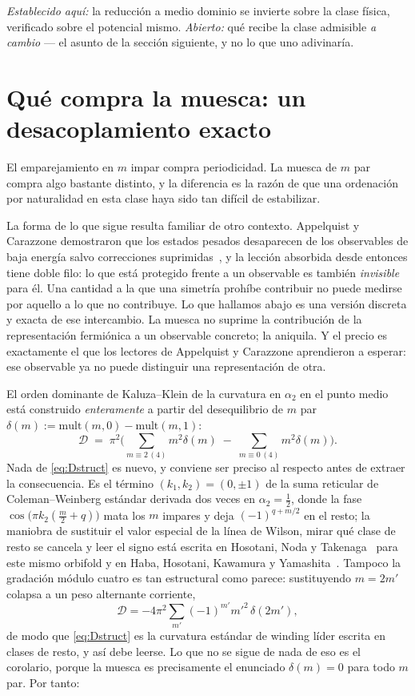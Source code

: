 \documentclass[11pt,a4paper]{article}
\begin{document}
\emph{Establecido aquí:} la reducción a medio dominio se invierte sobre la clase física,
verificado sobre el potencial mismo. \emph{Abierto:} qué recibe la clase admisible \emph{a
cambio} --- el asunto de la sección siguiente, y no lo que uno adivinaría.

\section{Qué compra la muesca: un desacoplamiento exacto}\label{sec:decoupling}
El emparejamiento en $m$ impar compra periodicidad. La muesca de $m$ par compra algo bastante
distinto, y la diferencia es la razón de que una ordenación por naturalidad en esta clase haya
sido tan difícil de estabilizar.

La forma de lo que sigue resulta familiar de otro contexto. Appelquist y Carazzone demostraron
que los estados pesados desaparecen de los observables de baja energía salvo correcciones
suprimidas~\cite{AppelquistCarazzone}, y la lección absorbida desde entonces tiene doble filo:
lo que está protegido frente a un observable es también \emph{invisible} para él. Una cantidad
a la que una simetría prohíbe contribuir no puede medirse por aquello a lo que no contribuye.
Lo que hallamos abajo es una versión discreta y exacta de ese intercambio. La muesca no
suprime la contribución de la representación fermiónica a un observable concreto; la aniquila.
Y el precio es exactamente el que los lectores de Appelquist y Carazzone aprendieron a
esperar: ese observable ya no puede distinguir una representación de otra.

El orden dominante de Kaluza--Klein de la curvatura en $\alpha_2$ en el punto medio está
construido \emph{enteramente} a partir del desequilibrio de $m$ par
$\delta(m):=\mathrm{mult}(m,0)-\mathrm{mult}(m,1)$:
\begin{equation}\label{eq:Dstruct}
\mathcal D\;=\;\pi^2\Big(\sum_{m\equiv2\,(4)}m^2\delta(m)\;-\;\sum_{m\equiv0\,(4)}m^2\delta(m)\Big).
\end{equation}
Nada de \eqref{eq:Dstruct} es nuevo, y conviene ser preciso al respecto antes de extraer la
consecuencia. Es el término $(k_1,k_2)=(0,\pm1)$ de la suma reticular de Coleman--Weinberg
estándar derivada dos veces en $\alpha_2=\tfrac12$, donde la fase
$\cos\big(\pi k_2(\tfrac m2+q)\big)$ mata los $m$ impares y deja $(-1)^{q+m/2}$ en el resto; la
maniobra de sustituir el valor especial de la línea de Wilson, mirar qué clase de resto se
cancela y leer el signo está escrita en Hosotani, Noda y
Takenaga~\cite[Ecs.~(6.5)--(6.7)]{HNT} para este mismo orbifold y en Haba, Hosotani, Kawamura y
Yamashita~\cite[Ec.~(46)]{HHKY}. Tampoco la gradación módulo cuatro es tan estructural como
parece: sustituyendo $m=2m'$ colapsa a un peso alternante corriente,
\[
\mathcal D=-4\pi^2\sum_{m'}(-1)^{m'}m'^2\,\delta(2m'),
\]
de modo que \eqref{eq:Dstruct} es la curvatura estándar de winding líder escrita en clases de
resto, y así debe leerse. Lo que no se sigue de nada de eso es el corolario, porque la muesca
es precisamente el enunciado $\delta(m)=0$ para todo $m$ par. Por tanto:
\end{document}

